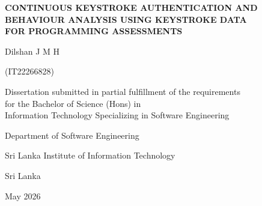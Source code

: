 \begin{titlepage}
  \centering
  \vspace*{1.2cm}

  {\fontsize{16}{24}\bfseries\MakeUppercase{%
    Continuous Keystroke Authentication and\\[4pt]
    Behaviour Analysis Using Keystroke Data\\[4pt]
    for Programming Assessments%
  }\par}

  \vspace{2.2cm}

  {\fontsize{14}{21}\selectfont
    Dilshan J M H\par}
  \vspace{4pt}
  {\fontsize{14}{21}\selectfont
    (IT22266828)\par}

  \vspace{1.4cm}

  {\fontsize{12}{18}\selectfont
    \begin{singlespace}
      Dissertation submitted in partial fulfillment of the requirements\\
      for the Bachelor of Science (Hons) in\\
      Information Technology Specializing in Software Engineering
    \end{singlespace}
  \par}

  \vspace{1.0cm}

  {\fontsize{14}{21}\selectfont
    Department of Software Engineering\par}
  \vspace{6pt}
  {\fontsize{14}{21}\selectfont
    Sri Lanka Institute of Information Technology\par}
  \vspace{4pt}
  {\fontsize{14}{21}\selectfont
    Sri Lanka\par}

  \vfill

  {\fontsize{14}{21}\selectfont
    May 2026\par}

\end{titlepage}
\clearpage
